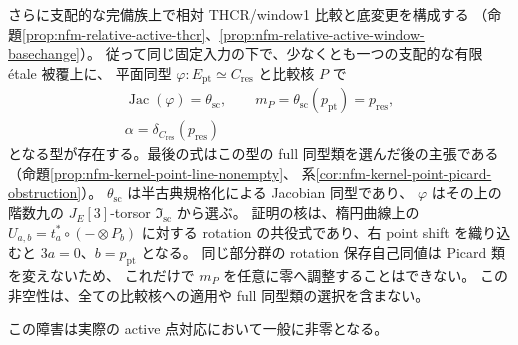 \documentclass[11pt,a4paper]{ltjsarticle}
\numberwithin{equation}{section}
\begin{document}
さらに支配的な完備族上で相対 THCR/window1 比較と底変更を構成する
（命題\ref{prop:nfm-relative-active-thcr}、\ref{prop:nfm-relative-active-window-basechange}）。
従って同じ固定入力の下で、少なくとも一つの支配的な有限 étale 被覆上に、
平面同型 $\varphi:E_{\mathrm{pt}}\simeq C_{\mathrm{res}}$ と比較核 $P$ で
\[
 \begin{gathered}
 \operatorname{Jac}(\varphi)=\theta_{\mathrm{sc}},\qquad
 m_P=\theta_{\mathrm{sc}}(p_{\mathrm{pt}})=p_{\mathrm{res}},\\
 \alpha=\delta_{C_{\mathrm{res}}}(p_{\mathrm{res}})
 \end{gathered}
\]
となる型が存在する。最後の式はこの型の full 同型類を選んだ後の主張である
（命題\ref{prop:nfm-kernel-point-line-nonempty}、
系\ref{cor:nfm-kernel-point-picard-obstruction}）。
$\theta_{\mathrm{sc}}$ は半古典規格化による Jacobian 同型であり、
$\varphi$ はその上の階数九の $J_E[3]$-torsor $\mathfrak I_{\mathrm{sc}}$ から選ぶ。
証明の核は、楕円曲線上の $U_{a,b}=t_a^*\circ(-\otimes P_b)$ に対する
rotation の共役式であり、右 point shift を織り込むと $3a=0$、$b=p_{\mathrm{pt}}$ となる。
同じ部分群の rotation 保存自己同値は Picard 類を変えないため、
これだけで $m_P$ を任意に零へ調整することはできない。
この非空性は、全ての比較核への適用や full 同型類の選択を含まない。

この障害は実際の active 点対応において一般に非零となる。
\end{document}
